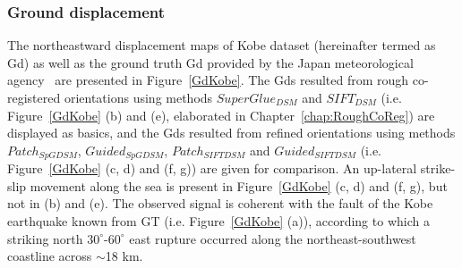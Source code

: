 \subsubsection{Ground displacement}
The northeastward displacement maps of Kobe dataset (hereinafter termed as Gd) as well as the ground truth Gd provided by the Japan meteorological agency~\cite{ian1996morphological} are presented in Figure~\ref{GdKobe}. 
The Gds resulted from rough co-registered orientations using methods $SuperGlue_{DSM}$ and $SIFT_{DSM}$ (i.e. Figure~\ref{GdKobe} (b) and (e), elaborated in Chapter~\ref{chap:RoughCoReg}) are displayed as basics, and the Gds resulted from refined orientations using methods $Patch_{SpGDSM}$, $Guided_{SpGDSM}$, $Patch_{SIFTDSM}$ and $Guided_{SIFTDSM}$ (i.e. Figure~\ref{GdKobe} (c, d) and (f, g)) are given for comparison. 
An up-lateral strike-slip movement along the sea is present in Figure~\ref{GdKobe} (c, d) and (f, g), but not in (b) and (e). The observed signal is coherent with the fault of the Kobe earthquake known from \ac{GT} (i.e. Figure~\ref{GdKobe} (a)), according to which a striking north $30^{\circ}$-$60^{\circ}$ east rupture occurred along the northeast-southwest coastline across $ \sim $18 km.\\

